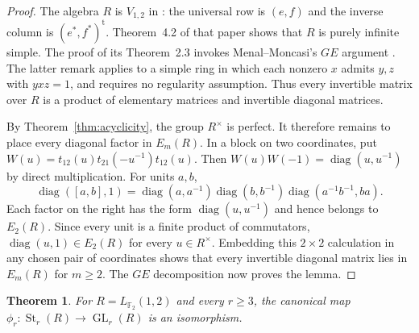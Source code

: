 \documentclass[11pt]{amsart}
\newcommand{\F}{\mathbb F}
\DeclareMathOperator{\GL}{GL}
\DeclareMathOperator{\St}{St}
\newtheorem{theorem}{Theorem}[section]
\theoremstyle{definition}
\theoremstyle{remark}
\numberwithin{equation}{section}
\begin{document}
\begin{proof}
The algebra $R$ is $V_{1,2}$ in \cite[\S4]{AGP02}: the universal row is $(e,f)$ and the inverse column is $(e^*,f^*)^{\mathrm t}$. Theorem~4.2 of that paper shows that $R$ is purely infinite simple. The proof of its Theorem~2.3 invokes Menal--Moncasi's $GE$ argument \cite[Theorem~2.2 and the remark after Corollary~2.3]{MM84}. The latter remark applies to a simple ring in which each nonzero $x$ admits $y,z$ with $yxz=1$, and requires no regularity assumption. Thus every invertible matrix over $R$ is a product of elementary matrices and invertible diagonal matrices.

By Theorem~\ref{thm:acyclicity}, the group $R^\times$ is perfect. It therefore remains to place every diagonal factor in $E_m(R)$. In a block on two coordinates, put $W(u)=t_{12}(u)t_{21}(-u^{-1})t_{12}(u)$. Then $W(u)W(-1)=\operatorname{diag}(u,u^{-1})$ by direct multiplication. For units $a,b$,
$$
\operatorname{diag}([a,b],1) =\operatorname{diag}(a,a^{-1}) \operatorname{diag}(b,b^{-1}) \operatorname{diag}(a^{-1}b^{-1},ba).
$$
Each factor on the right has the form $\operatorname{diag}(u,u^{-1})$ and hence belongs to $E_2(R)$. Since every unit is a finite product of commutators, $\operatorname{diag}(u,1)\in E_2(R)$ for every $u\in R^\times$. Embedding this $2\times2$ calculation in any chosen pair of coordinates shows that every invertible diagonal matrix lies in $E_m(R)$ for $m\geq2$. The $GE$ decomposition now proves the lemma.
\end{proof}

\begin{theorem}
\label{thm:steinberg-isomorphism}
For $R=L_{\F_2}(1,2)$ and every $r\geq3$, the canonical map $\phi_r:\St_r(R)\to\GL_r(R)$ is an isomorphism.
\end{theorem}
\end{document}
